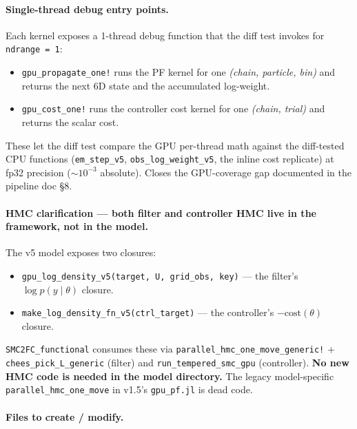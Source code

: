 \documentclass[11pt,a4paper]{article}
\begin{document}
\paragraph{Single-thread debug entry points.} Each kernel exposes a
1-thread debug function that the diff test invokes for
\texttt{ndrange = 1}:

\begin{itemize}[itemsep=0pt]
  \item \texttt{gpu\_propagate\_one!} runs the PF kernel for one
        \emph{(chain, particle, bin)} and returns the next 6D state
        and the accumulated log-weight.
  \item \texttt{gpu\_cost\_one!} runs the controller cost kernel for
        one \emph{(chain, trial)} and returns the scalar cost.
\end{itemize}

These let the diff test compare the GPU per-thread math against the
diff-tested CPU functions (\texttt{em\_step\_v5},
\texttt{obs\_log\_weight\_v5}, the inline cost replicate) at fp32
precision ($\sim 10^{-3}$ absolute). Closes the GPU-coverage gap
documented in the pipeline doc \S8.

\paragraph{HMC clarification --- both filter and controller HMC live
in the framework, not in the model.} The v5 model exposes two
closures:

\begin{itemize}[itemsep=0pt]
  \item \texttt{gpu\_log\_density\_v5(target, U, grid\_obs, key)} ---
        the filter's $\log p(y \mid \theta)$ closure.
  \item \texttt{make\_log\_density\_fn\_v5(ctrl\_target)} --- the
        controller's $-\mathrm{cost}(\theta)$ closure.
\end{itemize}

\texttt{SMC2FC\_functional} consumes these via
\texttt{parallel\_hmc\_one\_move\_generic!} +
\texttt{chees\_pick\_L\_generic} (filter) and
\texttt{run\_tempered\_smc\_gpu} (controller). \textbf{No new HMC
code is needed in the model directory.} The legacy
model-specific \texttt{parallel\_hmc\_one\_move} in v1.5's
\texttt{gpu\_pf.jl} is dead code.

\paragraph{Files to create / modify.}
\end{document}
